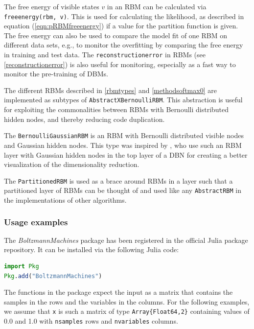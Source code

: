 \documentclass[12pt]{article}
\newcommand{\inlinecode}[1]{\texttt{#1}}
\newcommand{\apkg}[1]{\emph{#1}}
\begin{document}
The free energy of visible states $v$ in an RBM can be calculated via  \inlinecode{freeenergy(rbm, v)}.
This is used for calculating the likelihood, as described in equation (\ref{eqn:pRBMfreeenergy}) if a value for the partition function is given.
The free energy can also be used to compare the model fit of one RBM on different data sets, e.g., to monitor the overfitting by comparing the free energy in training and test data.
The \inlinecode{reconstructionerror} in RBMs (see \ref{reconstructionerror}) is also useful for monitoring, especially as a fast way to monitor the pre-training of DBMs.

The different RBMs described in \ref{rbmtypes} and \ref{methodsoftmax0} are implemented as subtypes of \inlinecode{AbstractXBernoulliRBM}.
This abstraction is useful for exploiting the commonalities between RBMs with Bernoulli distributed hidden nodes, and thereby reducing code duplication.

The \inlinecode{BernoulliGaussianRBM} is an RBM with Bernoulli distributed visible nodes and Gaussian hidden nodes.
This type was inspired by \cite{hinton_reducing_2006}, who use such an RBM layer with Gaussian hidden nodes in the top layer of a DBN for creating a better visualization of the dimensionality reduction.

The \inlinecode{PartitionedRBM} is used as a brace around RBMs in a layer such that a partitioned layer of RBMs can be thought of and used like any \inlinecode{AbstractRBM} in the implementations of other algorithms.



\subsubsection{Usage examples}\label{bmusage}
The \apkg{BoltzmannMachines} package has been registered in the official Julia package repository. It can be installed via the following Julia code:

\begin{lstlisting}[language=Julia]
import Pkg
Pkg.add("BoltzmannMachines")
\end{lstlisting}

The functions in the package expect the input as a matrix that contains the samples in the rows and the variables in the columns.
For the following examples, we assume that \inlinecode{x} is such a matrix of type \inlinecode{Array\{Float64,2\}} containing values of 0.0 and 1.0 with \inlinecode{nsamples} rows and \inlinecode{nvariables} columns.
\end{document}
